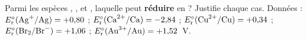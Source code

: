\documentclass[11pt,a4paper]{article}
\begin{document}
\begin{exo}
Parmi les espèces , ,  et , laquelle peut \textbf{réduire}
 en  ? Justifie chaque cas. Données : $E_{\mathrm{r}}^{\circ}(\ce{Ag+}/\ce{Ag})
=+0{,}80$ ; $E_{\mathrm{r}}^{\circ}(\ce{Ca^{2+}}/\ce{Ca})=-2{,}84$ ;
$E_{\mathrm{r}}^{\circ}(\ce{Cu^{2+}}/\ce{Cu})=+0{,}34$ ;
$E_{\mathrm{r}}^{\circ}(\ce{Br2}/\ce{Br^-})=+1{,}06$ ;
$E_{\mathrm{r}}^{\circ}(\ce{Au^{3+}}/\ce{Au})=+1{,}52$~V.
\end{exo}
\end{document}
